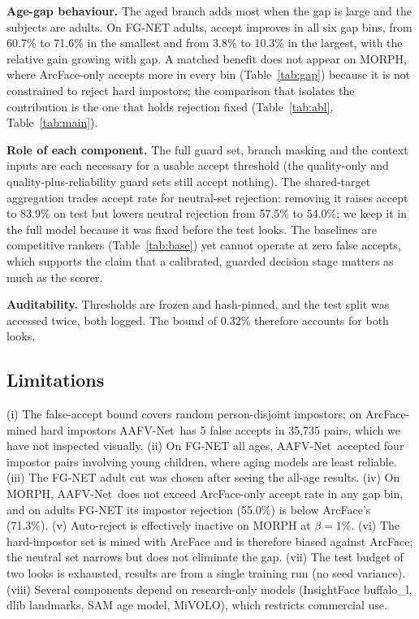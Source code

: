 \documentclass[10pt,twocolumn]{article}
\newcommand{\sys}{AAFV-Net}
\begin{document}
\textbf{Age-gap behaviour.} The aged branch adds most when the gap is large and the subjects are adults. On FG-NET adults, accept improves in all six gap bins, from 60.7\% to 71.6\% in the smallest and from 3.8\% to 10.3\% in the largest, with the relative gain growing with gap. A matched benefit does not appear on MORPH, where ArcFace-only accepts more in every bin (Table~\ref{tab:gap}) because it is not constrained to reject hard impostors; the comparison that isolates the contribution is the one that holds rejection fixed (Table~\ref{tab:abl}, Table~\ref{tab:main}).

\textbf{Role of each component.} The full guard set, branch masking and the context inputs are each necessary for a usable accept threshold (the quality-only and quality-plus-reliability guard sets still accept nothing). The shared-target aggregation trades accept rate for neutral-set rejection: removing it raises accept to 83.9\% on test but lowers neutral rejection from 57.5\% to 54.0\%; we keep it in the full model because it was fixed before the test looks. The baselines are competitive rankers (Table~\ref{tab:base}) yet cannot operate at zero false accepts, which supports the claim that a calibrated, guarded decision stage matters as much as the scorer.

\textbf{Auditability.} Thresholds are frozen and hash-pinned, and the test split was accessed twice, both logged. The bound of 0.32\% therefore accounts for both looks.

\subsection{Limitations}
(i) The false-accept bound covers random person-disjoint impostors; on ArcFace-mined hard impostors \sys\ has 5 false accepts in 35{,}735 pairs, which we have not inspected visually. (ii) On FG-NET all ages, \sys\ accepted four impostor pairs involving young children, where aging models are least reliable. (iii) The FG-NET adult cut was chosen after seeing the all-age results. (iv) On MORPH, \sys\ does not exceed ArcFace-only accept rate in any gap bin, and on adults FG-NET its impostor rejection (55.0\%) is below ArcFace's (71.3\%). (v) Auto-reject is effectively inactive on MORPH at $\beta=1\%$. (vi) The hard-impostor set is mined with ArcFace and is therefore biased against ArcFace; the neutral set narrows but does not eliminate the gap. (vii) The test budget of two looks is exhausted, results are from a single training run (no seed variance). (viii) Several components depend on research-only models (InsightFace buffalo\_l, dlib landmarks, SAM age model, MiVOLO), which restricts commercial use.
\end{document}
